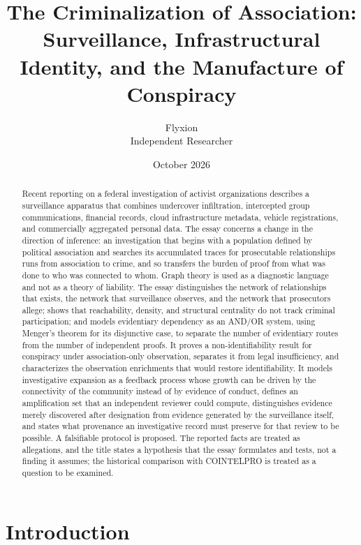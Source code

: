 \documentclass[11pt]{article}
\title{The Criminalization of Association:\\
Surveillance, Infrastructural Identity, and the Manufacture of Conspiracy}
\author{Flyxion\\Independent Researcher}
\date{October 2026}
\theoremstyle{definition}
\theoremstyle{remark}
\begin{document}
\maketitle

\begin{abstract}
\noindent
Recent reporting on a federal investigation of activist organizations describes a surveillance apparatus that combines undercover infiltration, intercepted group communications, financial records, cloud infrastructure metadata, vehicle registrations, and commercially aggregated personal data. The essay concerns a change in the direction of inference: an investigation that begins with a population defined by political association and searches its accumulated traces for prosecutable relationships runs from association to crime, and so transfers the burden of proof from what was done to who was connected to whom. Graph theory is used as a diagnostic language and not as a theory of liability. The essay distinguishes the network of relationships that exists, the network that surveillance observes, and the network that prosecutors allege; shows that reachability, density, and structural centrality do not track criminal participation; and models evidentiary dependency as an AND/OR system, using Menger's theorem for its disjunctive case, to separate the number of evidentiary routes from the number of independent proofs. It proves a non-identifiability result for conspiracy under association-only observation, separates it from legal insufficiency, and characterizes the observation enrichments that would restore identifiability. It models investigative expansion as a feedback process whose growth can be driven by the connectivity of the community instead of by evidence of conduct, defines an amplification set that an independent reviewer could compute, distinguishes evidence merely discovered after designation from evidence generated by the surveillance itself, and states what provenance an investigative record must preserve for that review to be possible. A falsifiable protocol is proposed. The reported facts are treated as allegations, and the title states a hypothesis that the essay formulates and tests, not a finding it assumes; the historical comparison with COINTELPRO is treated as a question to be examined.
\end{abstract}

\section{Introduction}
\end{document}
